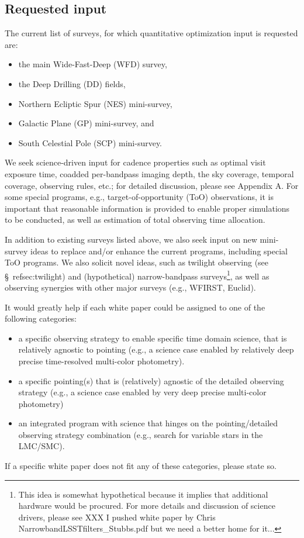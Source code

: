 \documentclass[DM,lsstdraft,toc,usenatbib]{lsstdoc}
\begin{document}
\subsection{Requested input}


The current list of surveys, for which quantitative optimization input is requested are:
\begin{itemize}
\item the main Wide-Fast-Deep (WFD) survey,
\item the Deep Drilling (DD) fields,
\item Northern Ecliptic Spur (NES) mini-survey, 
\item Galactic Plane (GP) mini-survey, and
\item South Celestial Pole (SCP) mini-survey.
\end{itemize}

We seek science-driven input for cadence properties such as optimal visit exposure time,
coadded per-bandpass imaging depth, the sky coverage, temporal coverage, observing
rules, etc.; for detailed discussion, please see Appendix A. For some special programs, 
e.g., target-of-opportunity (ToO) observations, it is important that reasonable
information is provided to enable proper simulations to be conducted, as well as estimation
of total observing time allocation.

In addition to existing surveys listed above, we also seek input on new mini-survey ideas 
to replace and/or enhance the current programs, including special ToO programs. We also 
solicit novel ideas, such as twilight observing (see \S~ref{sec:twilight}) 
and (hypothetical) narrow-bandpass surveys\footnote{This idea is somewhat hypothetical 
because it implies that additional hardware would be procured. For more details and 
discussion of science drivers, please see XXX I pushed white paper by Chris 
NarrowbandLSSTfilters\_Stubbs.pdf but we need a better home for it...}, as well as observing 
synergies with other major surveys (e.g., WFIRST, Euclid). 

It would greatly help if each white paper could be assigned to one of the following
categories:  
\begin{itemize} 
\item a specific observing strategy to enable specific time domain science, 
	that is relatively agnostic to pointing (e.g., a science case enabled 
	by relatively deep precise time-resolved multi-color photometry). 
\item a specific pointing(s) that is (relatively) agnostic of the detailed observing 
	strategy (e.g., a science case enabled by very deep precise multi-color 
	photometry) 
\item an integrated program with science that hinges on the pointing/detailed 
	observing strategy combination (e.g., search for variable stars in the 
	LMC/SMC). 
\end{itemize}  
If a specific white paper does not fit any of these categories, please state so.
\end{document}
